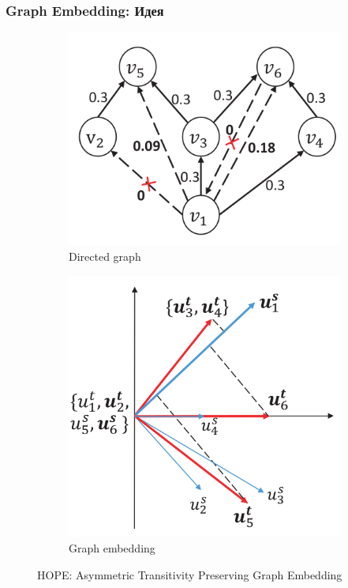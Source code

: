 \documentclass[xcolor=table,english]{beamer}
\begin{document}
\begin{frame}[fragile] \frametitle{Graph Embedding: Идея}
    \begin{minipage}[m]{\linewidth}
        \begin{figure}
            \centering
            \begin{subfigure}[b]{0.45\textwidth}
                \includegraphics[width=\textwidth]{figures/hope_graph.png}
                \caption{Directed graph}
            \end{subfigure}
            \hfill
            \begin{subfigure}[b]{0.45\textwidth}
                \includegraphics[width=\textwidth]{figures/hope_embedding.png}
                \caption{Graph embedding}
            \end{subfigure}
            \caption{HOPE: Asymmetric Transitivity Preserving Graph Embedding}
        \end{figure}
    \end{minipage}\hfill
\end{frame}
\end{document}
